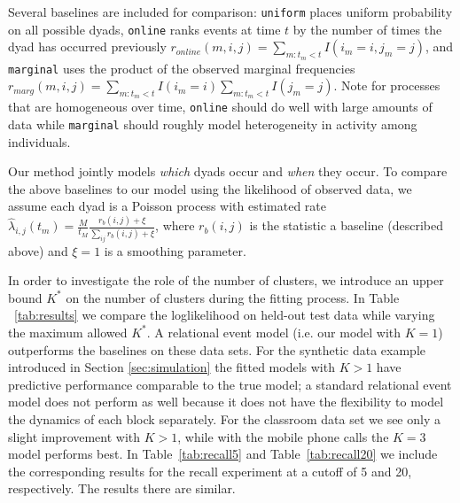 




Several baselines are included for comparison: \texttt{uniform} places uniform probability on all possible dyads, \texttt{online} ranks events at time $t$ by the number of times the dyad has occurred previously $r_{online}(m,i,j) = \sum_{m:t_m < t} I(i_m=i,j_m=j)$, and \texttt{marginal} uses the product of the observed marginal frequencies $r_{marg}(m,i,j) = \sum_{m:t_m < t} I(i_m=i) \sum_{m:t_m < t} I(j_m=j)$.
Note for processes that are homogeneous over time, \texttt{online} should do well with large amounts of data while \texttt{marginal} should roughly model heterogeneity in activity among individuals.

Our method jointly models \emph{which} dyads occur and \emph{when} they occur.
To compare the above baselines to our model using the likelihood of observed data, we assume each dyad is a Poisson process with estimated  rate $\hat{\lambda}_{i,j}(t_m) = \frac{M}{t_M} \frac{r_{b}(i,j) + \xi}{\sum_{ij} r_{b}(i,j) + \xi}$, where $r_b(i,j)$ is the statistic a baseline (described above) and $\xi=1$ is a smoothing parameter.

In order to investigate the role of the number of clusters, we introduce an upper bound $K^*$ on the number of clusters during the fitting process.  In Table ~\ref{tab:results} we compare the loglikelihood on held-out test data while varying the maximum allowed $K^*$.  A relational event model (i.e. our model with $K=1$) outperforms the baselines on these data sets.  For the synthetic data example introduced in Section \ref{sec:simulation} the fitted models with $K>1$ have predictive performance comparable to the true model; a standard relational event model does not perform as well because it does not have the flexibility to model the dynamics of each block separately.  For the classroom data set we see only a slight improvement with $K>1$, while with the mobile phone calls the $K=3$ model performs best.
In Table~\ref{tab:recall5} and Table~\ref{tab:recall20} we include the corresponding results for the recall experiment at a cutoff of 5 and 20, respectively.  The results there are similar.



